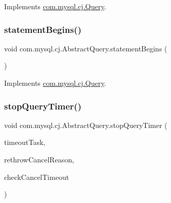 Implements \mbox{\hyperlink{interfacecom_1_1mysql_1_1cj_1_1_query_a05d5eedcc76ab8fe224f4e2df0e4d274}{com.\+mysql.\+cj.\+Query}}.

\mbox{\label{classcom_1_1mysql_1_1cj_1_1_abstract_query_ad497079522b832383db2916bcef4a74c}} 
\subsubsection{\texorpdfstring{statement\+Begins()}{statementBegins()}}
{\footnotesize\ttfamily void com.\+mysql.\+cj.\+Abstract\+Query.\+statement\+Begins (\begin{DoxyParamCaption}{ }\end{DoxyParamCaption})}



Implements \mbox{\hyperlink{interfacecom_1_1mysql_1_1cj_1_1_query_a103f171654654e894600c59f324b651b}{com.\+mysql.\+cj.\+Query}}.

\mbox{\label{classcom_1_1mysql_1_1cj_1_1_abstract_query_a3cd18b8d44105a54f7b044cf31c04c45}} 
\subsubsection{\texorpdfstring{stop\+Query\+Timer()}{stopQueryTimer()}}
{\footnotesize\ttfamily void com.\+mysql.\+cj.\+Abstract\+Query.\+stop\+Query\+Timer (\begin{DoxyParamCaption}\item[{\mbox{\hyperlink{interfacecom_1_1mysql_1_1cj_1_1_cancel_query_task}{Cancel\+Query\+Task}}}]{timeout\+Task,  }\item[{boolean}]{rethrow\+Cancel\+Reason,  }\item[{boolean}]{check\+Cancel\+Timeout }\end{DoxyParamCaption})}



